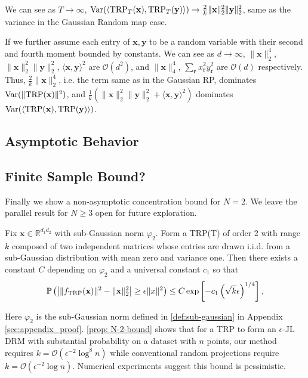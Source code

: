 We can see as $T \rightarrow \infty$, $	\mbox{Var}(\langle \textup{TRP}_T(\mathbf{x}), \textup{TRP}_T(\mathbf{y}) \rangle) \rightarrow \frac{2}{k}\|\mathbf{x}\|_2^2\|\mathbf{y}\|_2^2$, same as the variance in the Gaussian Random map case. 

\begin{remark}
If we further assume each entry of $\mathbf{x}, 
\mathbf{y}$ to be a random variable with their second and fourth moment bounded by constants. We can see as $d \rightarrow \infty$,  $\|\mathbf{x}\|_2^4$,  $\|\mathbf{x}\|_2^2\|\mathbf{y}\|_2^2$, $\langle \mathbf{x},\mathbf{y} \rangle^2$ are $\mathcal{O}(d^2)$, and $\|\mathbf{x}\|_4^4$, $\sum_{\mathbf{r}}x^2_{\mathbf{r}}y^2_{\mathbf{r}}$ are $\mathcal{O}(d)$ respectively. Thus, $\frac{2}{k}\|\mathbf{x}\|_2^4$, i.e. the term same as in the Gaussian RP, dominates $\mbox{Var}(\|\textup{TRP}(\mathbf{x})\|^2)$, and $\frac{1}{k}(\|\mathbf{x}\|_2^2\|\mathbf{y}\|_2^2 + \langle \mathbf{x}, \mathbf{y} \rangle^2)$ dominates $\mbox{Var}(\langle \textup{TRP}(\mathbf{x}), \textup{TRP}(\mathbf{y}) \rangle )$. 
\end{remark}

\subsection{Asymptotic Behavior}


\subsection{Finite Sample Bound?}
Finally we show a non-asymptotic concentration bound for $N=2$.
We leave the parallel result for $N\ge 3$ open for future exploration.


\begin{prop}
	\label{prop: N-2-bound}
	Fix $\mathbf{x} \in \mathbb{R}^{d_1 d_2}$ with sub-Gaussian norm $\varphi_2$.
	Form a \textup{TRP}(T) of order 2 with range $k$
	composed of two independent matrices whose entries are drawn i.i.d.
	from a sub-Gaussian distribution with mean zero and variance one.
	Then there exists a constant $C$ depending on $\varphi_2$
	and a universal constant $c_1$ %
	so that
	\begin{equation}
	\mathbb{P}\left(\left| \|f_{\textup{TRP}}(\mathbf{x})\|^2 - \|\mathbf{x}\|^2_2 \right| \ge \epsilon \|x\|^2\right)\le C\exp\left[ - c_1 \left(\sqrt{k}\epsilon\right)^{1/4} \right],\nonumber
	\end{equation}
	
\end{prop}
Here $\varphi_2$ is the sub-Gaussian norm defined in \ref{def:sub-gaussian} in Appendix \ref{sec:appendix_proof}.
\ref{prop: N-2-bound} shows that for a TRP to form an $\epsilon$-JL DRM
with substantial probability on a dataset with $n$ points,
our method requires $k=\mathcal{O}(\epsilon^{-2}\log^8 n)$ while
conventional random projections require $k=\mathcal{O}(\epsilon^{-2}\log n)$.
Numerical experiments suggest this bound is pessimistic.

